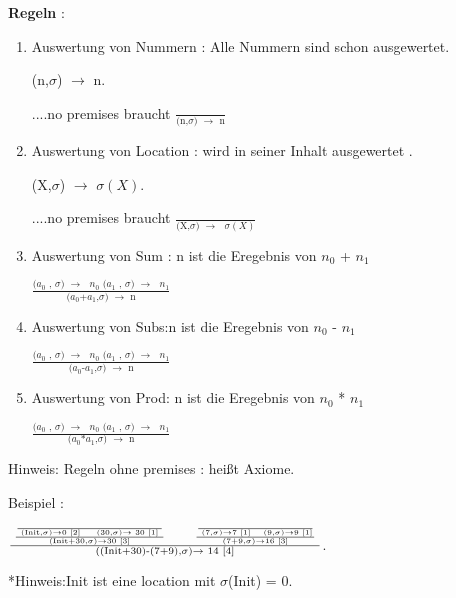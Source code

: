 \documentclass[a4paper,12pt,twoside,headsepline]{scrartcl}
\begin{document}
\textbf{Regeln} :\begin{enumerate}

\item  Auswertung von Nummern : Alle Nummern sind schon ausgewertet.\label{1}
\begin{center}
(n,$\sigma$) $\to$ n.    

 ....no premises braucht   $\frac{ } {\text{(n,$\sigma$) $\to$ n}}$
\end{center}  
\item Auswertung von Location : wird in seiner Inhalt ausgewertet .\label{2}

\begin{center}
	(X,$\sigma$) $\to$ $\sigma(X)$.    
	
	....no premises braucht    $\frac{ } {\text{(X,$\sigma$) $\to$ $\sigma(X)$}}$
\end{center} 

\item \label{3} Auswertung von Sum :  n ist die Eregebnis von $n_0$ + $n_1$

\begin{center}
	 $\frac  {\text {($a_0$ , $\sigma$) $\to$ $n_0$   ($a_1$ , $\sigma$) $\to$ $n_1$} } { \text{($a_0$+$a_1$,$\sigma$) $\to$ n} }$ 
\end{center}

\item  \label{4} Auswertung von Subs:n ist die Eregebnis von $n_0$ - $n_1$

\begin{center}
	$\frac  {\text {($a_0$ , $\sigma$) $\to$ $n_0$   ($a_1$ , $\sigma$) $\to$ $n_1$} } { \text{($a_0$-$a_1$,$\sigma$) $\to$ n} }$
	
	\end{center}

\item  \label{5} Auswertung von Prod: n ist die Eregebnis von $n_0$ * $n_1$

\begin{center}
	$\frac  {\text {($a_0$ , $\sigma$) $\to$ $n_0$   ($a_1$ , $\sigma$) $\to$ $n_1$} } { \text{($a_0$*$a_1$,$\sigma$) $\to$ n} }$
	\end{center}

\end{enumerate}   
Hinweis: Regeln ohne premises : heißt Axiome. 



Beispiel : 
\begin{center} \fontsize{18}{15}
	
	$\frac{  \text{  $\frac { \text {$\frac  {}  {\text{ (Init,$\sigma$)$\to$0 $\ref{2}$ $\quad$          (30,$\sigma$)$\to$ 30 $\ref{1}$ }}$}   } {\text{(Init+30,$\sigma$)$\to$30  $\ref{3}$}}$ $\qquad$   $\frac { \text {$\frac  {}  {\text{ (7,$\sigma$)$\to$7 $ $\ref{1}$\quad$           (9,$\sigma$)$\to$9 $\ref{1}$}}$}} {\text{(7+9,$\sigma$)$\to$16 $\ref{3}$}}$  }} {\text{((Init+30)-(7+9),$\sigma$)$\to$ 14 $\ref{4}$}}$.
	
	
	
	*Hinweis:Init ist eine location mit $\sigma$(Init) = 0. 
\end{center}
\end{document}
